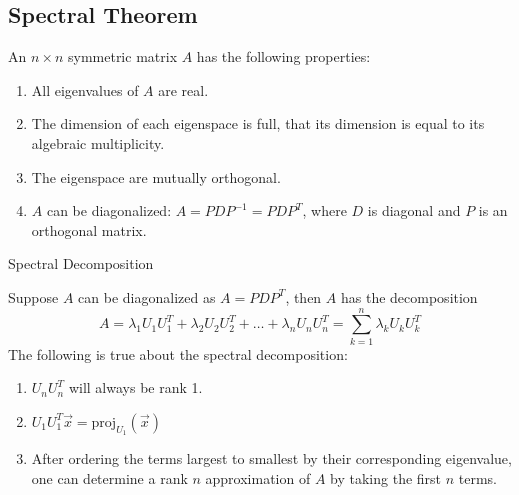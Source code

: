 \subsection{Spectral Theorem}
\begin{theorem}
    An \(n \times n\) symmetric matrix \(A\) has the following properties:
    \begin{enumerate}
        \item All eigenvalues of \(A\) are real.
        \item The dimension of each eigenspace is full, that its dimension is equal to its algebraic multiplicity.
        \item The eigenspace are mutually orthogonal.
        \item \(A\) can be diagonalized: \(A = P D P^{-1} = P D P^T\), where \(D\) is diagonal and \(P\) is an orthogonal matrix.
    \end{enumerate}
\end{theorem}

\begin{definition} Spectral Decomposition

    Suppose \(A\) can be diagonalized as \(A = P D P^T\), then \(A\) has the decomposition
    \[A = \lambda_1 U_1 U_1^T + \lambda_2 U_2 U_2^T + \dots + \lambda_n U_n U_n^T = \sum_{k=1}^{n} \lambda_k U_k U_k^T \]
    The following is true about the spectral decomposition:
    \begin{enumerate}
        \item \(U_n U_n^T\) will always be rank 1. 
        \item \(U_1 U_1^T \Vec{x} = \text{proj}_{U_1} (\Vec{x})\)
        \item After ordering the terms largest to smallest by their corresponding eigenvalue, one can determine a rank \(n\) approximation of \(A\) by taking the first \(n\) terms.
    \end{enumerate}
\end{definition}

